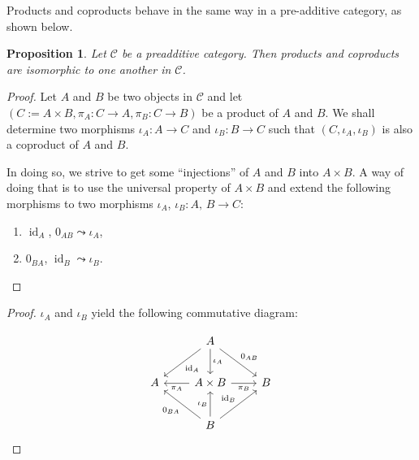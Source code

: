 \documentclass{beamer}
\newtheorem{proposition}{Proposition}
\DeclareMathOperator{\id}{id}
\begin{document}
\begin{frame}
    Products and coproducts behave in the same way in a
    pre-additive category, as shown below.

    \begin{proposition}
        Let $\mathcal{C}$ be a preadditive category. Then
        products and coproducts are isomorphic to one
        another in $\mathcal{C}$.
    \end{proposition}
\end{frame}

\begin{frame}
    \begin{proof}
        Let $A$ and $B$ be two objects in $\mathcal{C}$ and
        let $(C := A \times B, \pi_A : C \to A, \pi_B : C \to B)$ be a product of
        $A$ and $B$. We shall determine two morphisms
        $\iota_A : A \to C$ and $\iota_B : B \to C$ such that
        $(C, \iota_A, \iota_B)$ is also a coproduct of $A$ and
        $B$. \medskip

        In doing so, we strive to get some ``injections'' of $A$ and $B$
        into $A \times B$. A way of doing that is to use the universal
        property of $A \times B$ and extend the following morphisms
        to two morphisms $\iota_A$, $\iota_B : A, \, B \to C$:

        \begin{enumerate}
            \item $\id_A$, $0_{AB} \leadsto \iota_A$,
            \item $0_{BA}$, $\id_B \leadsto \iota_B$.
        \end{enumerate}
    \end{proof}
\end{frame}

\begin{frame}[fragile]
    \begin{proof}
        $\iota_A$ and $\iota_B$ yield the following commutative diagram:

        \[\begin{tikzcd}[sep=2.25em]
            & A \\
            A & {A \times B} & B \\
            & B
            \arrow["{\operatorname{id}_A}", from=1-2, to=2-1]
            \arrow["{\iota_A}", from=1-2, to=2-2]
            \arrow["{0_{AB}}", from=1-2, to=2-3]
            \arrow["{\pi_A}", from=2-2, to=2-1]
            \arrow["{\pi_B}"', from=2-2, to=2-3]
            \arrow["{0_{BA}}", from=3-2, to=2-1]
            \arrow["{\iota_B}", from=3-2, to=2-2]
            \arrow["{\operatorname{id}_B}", from=3-2, to=2-3]
        \end{tikzcd}\]
    \end{proof}
\end{frame}
\end{document}
